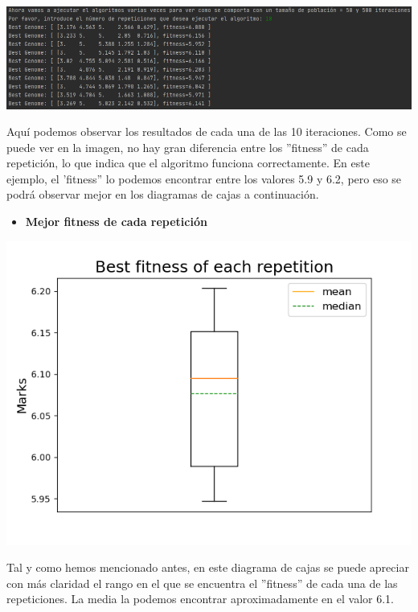 \documentclass[11pt, a4paper, titlepage]{article}
\begin{document}
\vspace{5mm}

\includegraphics[scale=0.6]{img/Res2_horas_sufi.png}

\vspace{5mm}

Aquí podemos observar los resultados de cada una de las 10 iteraciones. Como se puede ver en la imagen, no hay gran diferencia entre los ''fitness'' de cada repetición, lo que indica que el algoritmo funciona correctamente. En este ejemplo, el 'fitness'' lo podemos encontrar entre los valores 5.9 y 6.2, pero eso se podrá observar mejor en los diagramas de cajas a continuación. 

\newpage

\begin{itemize}
\item \textbf{Mejor fitness de cada repetición}
\end{itemize}

\includegraphics[scale=0.6]{img/grafica1_horsuf}

\vspace{5mm}

Tal y como hemos mencionado antes, en este diagrama de cajas se puede apreciar con más claridad el rango en el que se encuentra el ''fitness'' de cada una de las repeticiones. La media la podemos encontrar aproximadamente en el valor 6.1.
\end{document}
